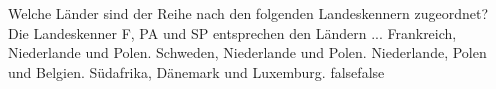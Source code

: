     {Welche Länder sind der Reihe nach den folgenden Landeskennern zugeordnet? Die Landeskenner F, PA und SP entsprechen den Ländern ...}
    {Frankreich, Niederlande und Polen.}
    {Schweden, Niederlande und Polen.}
    {Niederlande, Polen und Belgien.}
    {Südafrika, Dänemark und Luxemburg.}
    {false}{false}